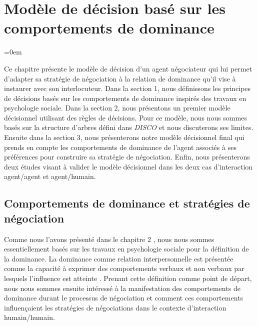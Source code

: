 \chapter{Modèle de décision basé sur les comportements de dominance}
	\label{chap:dec}
	
	\begingroup
	\parindent=0em
	\localtableofcontents 
	\clearpage
	\endgroup
	
	Ce chapitre présente le modèle de décision d'un agent négociateur qui lui permet d'adapter sa stratégie de négociation à la relation de dominance qu'il vise à instaurer avec son interlocuteur. Dans la section 1, nous définissons les principes de décisions basés sur les comportements de dominance inspirés des travaux en psychologie sociale. Dans la section 2, nous présentons un premier modèle décisionnel utilisant des règles de décisions.  Pour ce modèle, nous nous sommes basés sur la structure d'arbres défini dans \emph{DISCO} \cite{rich09} et nous discuterons ses limites. Ensuite dans la section 3, nous présenterons notre modèle décisionnel final qui prends en compte les comportements de dominance de l'agent associés à ses préférences pour construire sa stratégie de négociation. Enfin, nous présenterons deux études visant à valider le modèle décisionnel dans les deux cas d'interaction agent/agent et agent/humain.
	
	\section{Comportements de dominance et stratégies de négociation}
	
	\label{chap:domer}
	Comme nous l'avons présenté dans le chapitre 2  %
	, nous nous sommes essentiellement basés sur les travaux en psychologie sociale pour la définition de la dominance. 
	La dominance comme relation interpersonnelle est présentée comme la capacité à exprimer des comportements verbaux et non verbaux par lesquels l'influence est atteinte \cite{burgoon2006nonverbal}. Prenant cette définition comme point de départ, nous nous sommes ensuite intéressé à la manifestation des comportements de dominance durant le processus de négociation et comment ces comportements influençaient les stratégies de négociations dans le contexte d'interaction humain/humain. 
	
